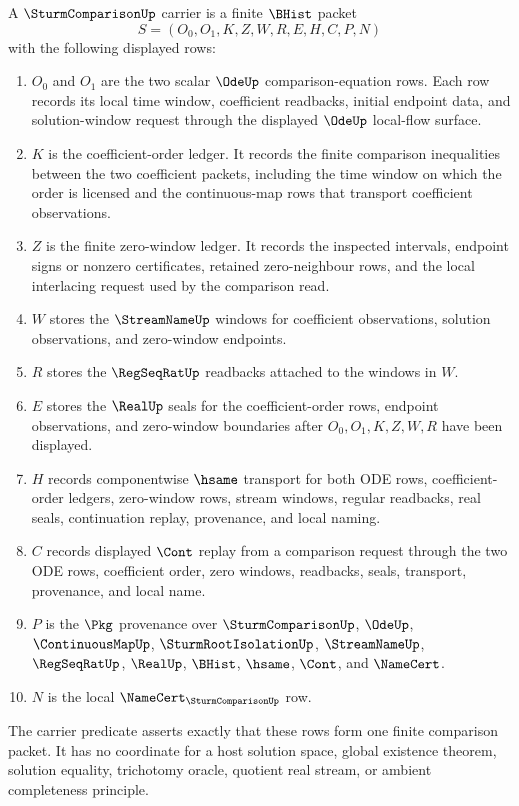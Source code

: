 \begin{definition}\label{def:sturm-comparison-carrier}
A $\SturmComparisonUp$ carrier is a finite $\BHist$ packet
$$
S=(O_0,O_1,K,Z,W,R,E,H,C,P,N)
$$
with the following displayed rows:
\begin{enumerate}
\item $O_0$ and $O_1$ are the two scalar $\OdeUp$ comparison-equation rows. Each row records its local time window, coefficient readbacks, initial endpoint data, and solution-window request through the displayed $\OdeUp$ local-flow surface.
\item $K$ is the coefficient-order ledger. It records the finite comparison inequalities between the two coefficient packets, including the time window on which the order is licensed and the continuous-map rows that transport coefficient observations.
\item $Z$ is the finite zero-window ledger. It records the inspected intervals, endpoint signs or nonzero certificates, retained zero-neighbour rows, and the local interlacing request used by the comparison read.
\item $W$ stores the $\StreamNameUp$ windows for coefficient observations, solution observations, and zero-window endpoints.
\item $R$ stores the $\RegSeqRatUp$ readbacks attached to the windows in $W$.
\item $E$ stores the $\RealUp$ seals for the coefficient-order rows, endpoint observations, and zero-window boundaries after $O_0,O_1,K,Z,W,R$ have been displayed.
\item $H$ records componentwise $\hsame$ transport for both ODE rows, coefficient-order ledgers, zero-window rows, stream windows, regular readbacks, real seals, continuation replay, provenance, and local naming.
\item $C$ records displayed $\Cont$ replay from a comparison request through the two ODE rows, coefficient order, zero windows, readbacks, seals, transport, provenance, and local name.
\item $P$ is the $\Pkg$ provenance over $\SturmComparisonUp$, $\OdeUp$, $\ContinuousMapUp$, $\SturmRootIsolationUp$, $\StreamNameUp$, $\RegSeqRatUp$, $\RealUp$, $\BHist$, $\hsame$, $\Cont$, and $\NameCert$.
\item $N$ is the local $\NameCert_{\SturmComparisonUp}$ row.
\end{enumerate}
The carrier predicate asserts exactly that these rows form one finite comparison packet. It has no coordinate for a host solution space, global existence theorem, solution equality, trichotomy oracle, quotient real stream, or ambient completeness principle.
\end{definition}

